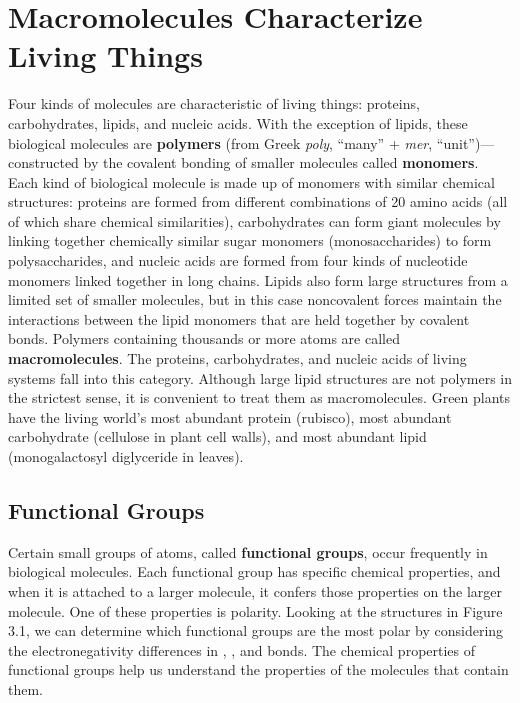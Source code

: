 \documentclass{report}
\begin{document}
\section{Macromolecules Characterize Living Things}

Four kinds of molecules are characteristic of living things: proteins, carbohydrates, lipids, and nucleic acids. With the exception of lipids, these biological molecules are \textbf{polymers} (from Greek \emph{poly}, ``many'' + \emph{mer}, ``unit'')---constructed by the covalent bonding of smaller molecules called \textbf{monomers}. Each kind of biological molecule is made up of monomers with similar chemical structures: proteins are formed from different combinations of 20 amino acids (all of which share chemical similarities), carbohydrates can form giant molecules by linking together chemically similar sugar monomers (monosaccharides) to form polysaccharides, and nucleic acids are formed from four kinds of nucleotide monomers linked together in long chains. Lipids also form large structures from a limited set of smaller molecules, but in this case noncovalent forces maintain the interactions between the lipid monomers that are held together by covalent bonds. Polymers containing thousands or more atoms are called \textbf{macromolecules}. The proteins, carbohydrates, and nucleic acids of living systems fall into this category. Although large lipid structures are not polymers in the strictest sense, it is convenient to treat them as macromolecules. Green plants have the living world's most abundant protein (rubisco), most abundant carbohydrate (cellulose in plant cell walls), and most abundant lipid (monogalactosyl diglyceride in leaves).

\subsection{Functional Groups}

Certain small groups of atoms, called \textbf{functional groups}, occur frequently in biological molecules. Each functional group has specific chemical properties, and when it is attached to a larger molecule, it confers those properties on the larger molecule. One of these properties is polarity. Looking at the structures in Figure 3.1, we can determine which functional groups are the most polar by considering the electronegativity differences in , , and  bonds. The chemical properties of functional groups help us understand the properties of the molecules that contain them.
\end{document}
